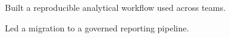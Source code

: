 \documentclass[fontsize=10pt, margin=narrow]{careerdossier-resume}
\begin{document}
\MakeCDossierHeader
{}
\begin{CDossierEntry}[
  title        = {Senior Data Scientist},
  organization = {Example Corp},
  location     = {Toronto, ON},
  dates        = {2024--Present}
]
  \begin{CDossierItemize}
    \item Built a reproducible analytical workflow used across teams.
    \item Led a migration to a governed reporting pipeline.
  \end{CDossierItemize}
\end{CDossierEntry}
\end{document}
